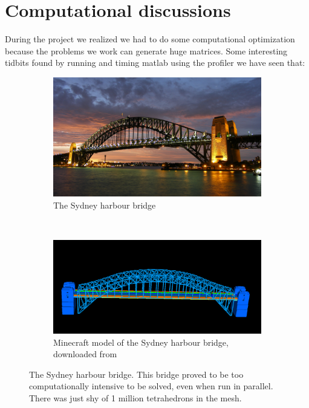 \section{Computational discussions}

During the project we realized we had to do some computational optimization because the problems we work can generate huge matrices. Some interesting tidbits found by running and timing matlab using the profiler we have seen that:


\begin{figure}[ht]
        \centering
        \begin{subfigure}[b]{0.45 \textwidth}
                \includegraphics[width=\textwidth]{Sydney_pic}
                \caption{The Sydney harbour bridge}
        \end{subfigure}
        ~
        \begin{subfigure}[b]{0.45 \textwidth}
                \includegraphics[width=\textwidth]{sydneyBridge}
                \caption{Minecraft model of the Sydney harbour bridge, downloaded from }
        \end{subfigure}
        \caption{The Sydney harbour bridge. This bridge proved to be too computationally intensive to be solved, even when run in parallel. There was just shy of 1 million tetrahedrons in the mesh.}
        \label{fig:sydney}
\end{figure}



